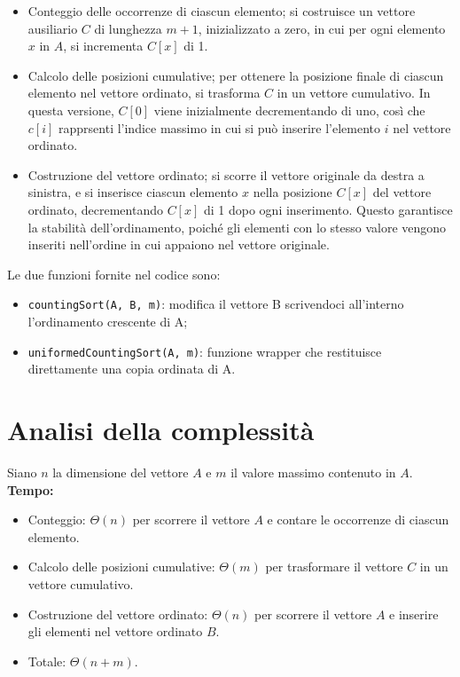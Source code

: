 \documentclass[a4paper, 12pt, oneside]{book}
\begin{document}
\begin{itemize}
    \item Conteggio delle occorrenze di ciascun elemento; si costruisce un vettore ausiliario \(C\) di lunghezza \(m+1\), inizializzato a zero, in cui per ogni elemento \(x\) in \(A\), si incrementa \(C[x]\) di 1.
    \item Calcolo delle posizioni cumulative; per ottenere la posizione finale di ciascun elemento nel vettore ordinato, si trasforma \(C\) in un vettore cumulativo. In questa versione, \(C[0]\) viene inizialmente decrementando di uno, così che \(c[i]\) rapprsenti l'indice massimo in cui si può inserire l'elemento \(i\) nel vettore ordinato.
    \item Costruzione del vettore ordinato; si scorre il vettore originale da destra a sinistra, e si inserisce ciascun elemento \(x\) nella posizione \(C[x]\) del vettore ordinato, decrementando \(C[x]\) di 1 dopo ogni inserimento. Questo garantisce la stabilità dell'ordinamento, poiché gli elementi con lo stesso valore vengono inseriti nell'ordine in cui appaiono nel vettore originale.
\end{itemize}

\noindent Le due funzioni fornite nel codice sono:

\begin{itemize}
    \item \texttt{countingSort(A, B, m)}: modifica il vettore B scrivendoci all'interno l'ordinamento crescente di A;
    \item \texttt{uniformedCountingSort(A, m)}: funzione wrapper che restituisce direttamente una copia ordinata di A.
\end{itemize}

\section{Analisi della complessità}

Siano \(n\) la dimensione del vettore \(A\) e \(m\) il valore massimo contenuto in \(A\). \\

\noindent \textbf{Tempo:}

\begin{itemize}
    \item Conteggio: \(\Theta(n)\) per scorrere il vettore \(A\) e contare le occorrenze di ciascun elemento.
    \item Calcolo delle posizioni cumulative: \(\Theta(m)\) per trasformare il vettore \(C\) in un vettore cumulativo.
    \item Costruzione del vettore ordinato: \(\Theta(n)\) per scorrere il vettore \(A\) e inserire gli elementi nel vettore ordinato \(B\).
    \item Totale: \(\Theta(n + m)\).
\end{itemize}
\end{document}
